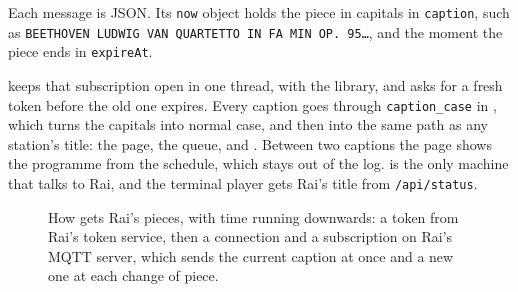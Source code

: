 \documentclass[11pt,a4paper]{article}
\begin{document}
Each message is JSON. Its \texttt{now} object holds the piece in capitals in \texttt{caption}, such as \texttt{BEETHOVEN LUDWIG VAN QUARTETTO IN FA MIN OP. 95\ldots}, and the moment the piece ends in \texttt{expireAt}.

 keeps that subscription open in one thread, with the  library, and asks for a fresh token before the old one expires. Every caption goes through \texttt{caption\_case} in , which turns the capitals into normal case, and then into the same path as any station's title: the page, the queue, and . Between two captions the page shows the programme from the schedule, which stays out of the log.  is the only machine that talks to Rai, and the terminal player gets Rai's title from  \texttt{/api/status}.

\begin{figure}[ht]
\centering
{}
\caption{How  gets Rai's pieces, with time running downwards: a token from Rai's token service, then a connection and a subscription on Rai's MQTT server, which sends the current caption at once and a new one at each change of piece.}
\label{fig:rai}
\end{figure}
\end{document}
